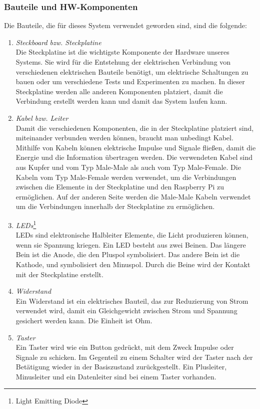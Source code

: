\subsubsection{Bauteile und HW-Komponenten}
Die Bauteile, die für dieses System verwendet geworden sind, sind die folgende:
\begin{enumerate}
	\item \textit{Steckboard bzw. Steckplatine}\\ 
	Die Steckplatine ist die wichtigste Komponente der Hardware unseres Systems. Sie wird für die Entstehung der elektrischen Verbindung von verschiedenen elektrischen Bauteile benötigt, um elektrische Schaltungen zu bauen oder um verschiedene Tests und Experimenten zu machen. In dieser Steckplatine werden alle anderen Komponenten platziert, damit die Verbindung erstellt werden kann und damit das System laufen kann.
	\item \textit{Kabel bzw. Leiter} \\
	Damit die verschiedenen Komponenten, die in der Steckplatine platziert sind, miteinander verbunden werden können, braucht man unbedingt Kabel. Mithilfe von Kabeln können elektrische Impulse und Signale fließen, damit die Energie und die Information übertragen werden. Die verwendeten Kabel sind aus Kupfer und vom Typ Male-Male als auch vom Typ Male-Female. Die Kabeln vom Typ Male-Female werden verwendet, um die Verbindungen zwischen die Elemente in der Steckplatine und den Raspberry Pi zu ermöglichen. Auf der anderen Seite werden die Male-Male Kabeln verwendet um die Verbindungen innerhalb der Steckplatine zu ermöglichen.
	\item \textit{LEDs}\footnote{Light Emitting Diode} \\
	LEDs sind elektronische Halbleiter Elemente, die Licht produzieren können, wenn sie Spannung kriegen. Ein LED besteht aus zwei Beinen. Das längere Bein ist die Anode, die den Pluspol symbolisiert. Das andere Bein ist die Kathode, und symbolisiert den Minuspol. Durch die Beine wird der Kontakt mit der Steckplatine erstellt.
	\item \textit{Widerstand} \\
	Ein Widerstand ist ein elektrisches Bauteil, das zur Reduzierung von Strom verwendet wird, damit ein Gleichgewicht zwischen Strom und Spannung gesichert werden kann. Die Einheit ist Ohm.
	\item \textit{Taster} \\
	Ein Taster wird wie ein Button gedrückt, mit dem Zweck Impulse oder Signale zu schicken. Im Gegenteil zu einem Schalter wird der Taster nach der Betätigung  wieder in der Basiszustand zurückgestellt. Ein Plusleiter, Minusleiter und ein Datenleiter sind bei einem Taster vorhanden.\cite{Taster}

\end{enumerate}
